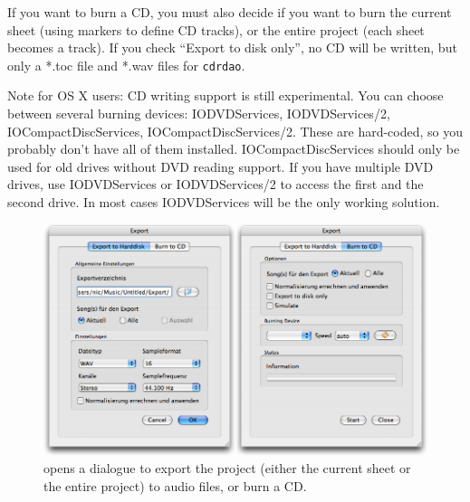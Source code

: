 If you want to burn a CD, you must also decide if you want to burn the current sheet (using markers to define CD tracks), or the entire project (each sheet becomes a track). If you check ``Export to disk only'', no CD will be written, but only a *.toc file and *.wav files for \texttt{cdrdao}.

Note for OS X users: CD writing support is still experimental. You can choose between several burning devices: IODVDServices, IODVDServices/2, IOCompactDiscServices, IOCompactDiscServices/2. These are hard-coded, so you probably don't have all of them installed. IOCompactDiscServices should only be used for old drives without DVD reading support. If you have multiple DVD drives, use IODVDServices or IODVDServices/2 to access the first and the second drive. In most cases IODVDServices will be the only working solution.

\begin{figure}[t]
 \centering\includegraphics[width=\textwidth]{images/exportdlg}
 \caption{ opens a dialogue to export the project (either the current sheet or the entire project) to audio files, or burn a CD.}
 \label{fig_exportdlg}
\end{figure}

